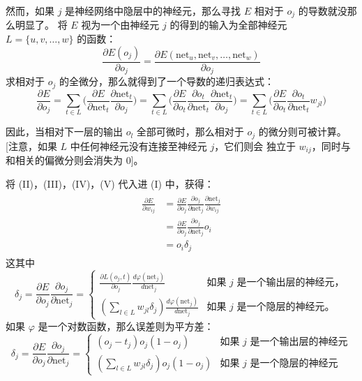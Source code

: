 \documentclass[../studies-ml.tex]{subfiles}
\begin{document}
\begin{enumerate}[I]
        然而，如果 $j$ 是神经网络中隐层中的神经元，那么寻找 $E$ 相对于 $o_j$ 的导数就没那么明显了。
        将 $E$ 视为一个由神经元 $j$ 的得到的输入为全部神经元 $L = \{u,v,\dots,w\}$ 的函数：
        \[
          \frac{\partial E(o_j)}{\partial o_j} =
          \frac{\partial E(\mathrm{net}_u,\mathrm{net}_v,\dots,\mathrm{net}_w)}{\partial o_j}
        \]
        求相对于 $o_j$ 的全微分，那么就得到了一个导数的递归表达式：
        \begin{equation}
          \frac{\partial E}{\partial o_j} =
          \sum_{t \in L}\Biggl(\frac{\partial E}{\partial\mathrm{net}_t}\frac{\partial\mathrm{net}_t}{\partial o_j}\Biggr)=
          \sum_{t \in L}
          \Biggl(
          \frac{\partial E}{\partial o_t}\frac{\partial o_t}{\partial\mathrm{net}_t}\frac{\partial\mathrm{net}_t}{\partial o_j}
          \Biggr)=
          \sum_{t \in L}\Biggl(\frac{\partial E}{\partial o_t}\frac{\partial o_t}{\partial\mathrm{net}_t}w_{jl}\Biggr)
          \tag{V}
        \end{equation}

        因此，当相对下一层的输出 $o_l$ 全部可微时，那么相对于 $o_j$ 的微分则可被计算。[注意，如果 $L$ 中任何神经元没有连接至神经元 $j$，它们则会
        独立于 $w_{ij}$，同时与和相关的偏微分则会消失为 0]。

        将 (II)，(III)，(IV)，(V) 代入进 (I) 中，获得：
        \begin{align*}
          \begin{split}
            \frac{\partial E}{\partial w_{ij}} & = \frac{\partial E}{\partial o_j} \frac{\partial o_j}{\partial\mathrm{net}_j}
            \frac{\partial\mathrm{net}_j}{\partial w_{ij}} \\
            & = \frac{\partial E}{\partial o_j} \frac{\partial o_j}{\partial\mathrm{net}_j} o_i \\
            & = o_i \delta_j
          \end{split}
        \end{align*}
        这其中
        \[
          \delta_j = \frac{\partial E}{\partial o_j} \frac{\partial o_j}{\partial\mathrm{net}_j} =
          \begin{cases}
            \frac{\partial L(o_j,t)}{\partial o_j}      \frac{d\varphi(\mathrm{net}_j)}{d\mathrm{net}_j} & \text{如果 $j$ 是一个输出层的神经元，} \\
            (\sum_{l \in L} w_{jl} \delta_j) \frac{d\varphi(\mathrm{net}_j)}{d\mathrm{net}_j}            & \text{如果 $j$ 是一个隐层的神经元。}
          \end{cases}
        \]
        如果 $\varphi$ 是一个对数函数，那么误差则为平方差：
        \[
          \delta_j = \frac{\partial E}{\partial o_j} \frac{\partial o_j}{\partial\mathrm{net}_j} =
          \begin{cases}
            (o_j - t_j) o_j (1 - o_j)                      & \text{如果 $j$ 是一个输出层的神经元} \\
            (\sum_{l \in L} w_{jl} \delta_j) o_j (1 - o_j) & \text{如果 $j$ 是一个隐层的神经元}
          \end{cases}
        \]


\end{enumerate}
\end{document}
